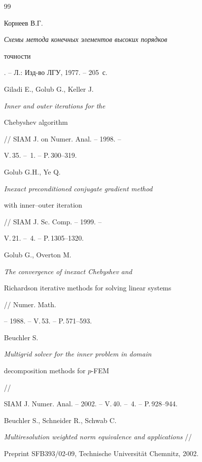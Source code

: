 \begin{thebibliography}{99}


Корнеев В.Г. {\it Схемы метода конечных элементов высоких порядков 


точности}. -- Л.: Изд-во ЛГУ, 1977. -- 205~с.







Giladi E., Golub G., Keller J. {\it Inner and outer iterations for the 


Chebyshev algorithm} // SIAM J. on Numer. Anal. -- 1998. --


V.\,35. -- \No\,1. -- P.\,300--319.







Golub G.H., Ye Q. {\it Inexact preconditioned conjugate gradient method 


with inner--outer iteration} // SIAM J. Sc. Comp. -- 1999. --


V.\,21. -- \No\,4. -- P.\,1305--1320.







Golub G., Overton M. {\it The convergence of inexact Chebyshev and 


Richardson iterative methods for solving linear systems} // Numer. Math. 


-- 1988. -- V.\,53. -- P.\,571--593.







Beuchler S. {\it Multigrid solver for the inner problem in domain 


decomposition methods for $p$-FEM} //


SIAM J. Numer. Anal. -- 2002. -- V.\,40. -- \No\,4. -- P.\,928--944.







Beuchler S., Schneider R., Schwab C.


{\it Multiresolution weighted norm equivalence and applications} //


Preprint SFB393/02-09, Technische Universit\"at Chemnitz, 2002.








\end{thebibliography}
